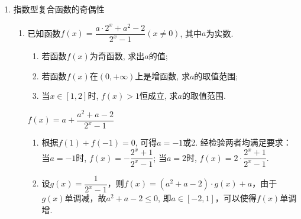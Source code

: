 \begin{enumerate}
\begin{enumerate}
\begin{jieda}
        \end{jieda}
    \end{enumerate}
    \item 指数型复合函数的奇偶性
    \begin{enumerate}
        \item 已知函数$f(x)=\dfrac{a\cdot2^x+a^2-2}{2^x-1}(x\neq0)$, 其中$a$为实数. 
        \begin{enumerate}[(1)]
            \item 若函数$f(x)$为奇函数, 求出$a$的值;
            \item 若函数$f(x)$在$(0,+\infty )$上是增函数, 求$a$的取值范围;
            \item 当$x\in\left[1,2\right]$时, $f(x)>1$恒成立, 求$a$的取值范围. 
            \end{enumerate}
            \begin{jieda}
            $f(x)=a+\dfrac{a^2+a-2}{2^x-1}$
            \begin{enumerate}
            \item 根据$f(1)+f(-1)=0$, 可得$a=-1$或2. 经检验两者均满足要求：\\
            当$a=-1$时, $f(x)=-\dfrac{2^x+1}{2^x-1}$; 当$a=2$时, $f(x)=2\cdot\dfrac{2^x+1}{2^x-1}$.
            \item 设$g(x)=\dfrac{1}{2^x-1}$，则$f(x) = (a^2+a-2) \cdot g(x)+a$，由于$g(x)$单调减，故$a^2+a-2\leq 0$, 即$a\in[-2,1]$，可以使得$f(x)$单调增. 
            

\end{enumerate}
\end{jieda}
\end{enumerate}
\end{enumerate}
